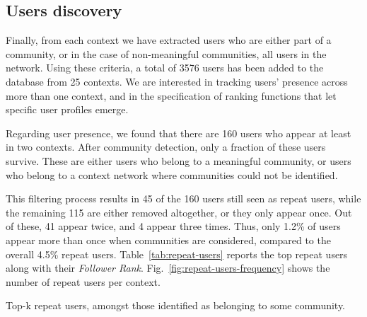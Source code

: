 \documentclass[runningheads]{llncs}
\begin{document}



\subsection{Users discovery}  \label{sec:users}

Finally, from each context we have extracted users who are either part of a community, or in the case of non-meaningful communities, all users in the network.
Using these criteria, a total of 3576 users has been added to the database from 25 contexts.
We are interested in tracking users' presence across more than one context, and in the specification of ranking functions that let specific user profiles emerge.

Regarding user presence, we found that there are 160 users who appear at least in two contexts. 
After community detection, only a fraction of these users survive. 
These are either users who belong to a meaningful community, or users who belong to a context network where communities could not be identified.

This filtering process results in 45 of the 160 users still seen as repeat users, while the remaining 115 are either removed altogether, or they only appear once. 
Out of these, 41 appear twice, and 4 appear three times. 
Thus, only 1.2\% of users appear more than once when communities are considered, compared to the overall 4.5\% repeat users.
%
Table~\ref{tab:repeat-users} reports the top repeat users along with their \textit{Follower Rank}.  
%
Fig.~\ref{fig:repeat-users-frequency} shows the number of repeat users per context. 


\begin{table}
	\centering
	
	
	\caption{Top-k repeat users, amongst those identified as belonging to some community.}
	
	\label{tab:repeat-users}
\end{table}	 
\end{document}
